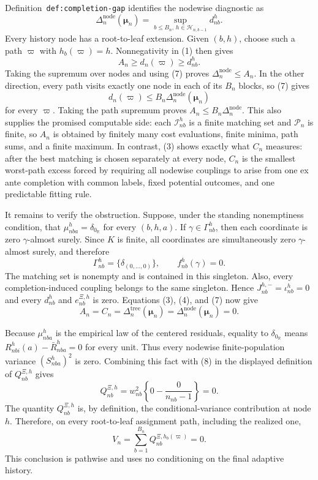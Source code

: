 Definition~\texttt{def:completion-gap} identifies the nodewise diagnostic as
\[
 \Delta_n^{\mathrm{node}}(\boldsymbol\mu_n)
 =\sup_{b\le B_n,\,h\in\mathcal H_{n,b-1}}d_{nb}^{h}. \tag{7}
\]
Every history node has a root-to-leaf extension.  Given \((b,h)\), choose such a path \(\varpi\) with \(h_b(\varpi)=h\).  Nonnegativity in (1) then gives
\[
 A_n\ge d_n(\varpi)\ge d_{nb}^{h}.
\]
Taking the supremum over nodes and using (7) proves
\(\Delta_n^{\mathrm{node}}\le A_n\).  In the other direction, every path visits exactly one node in each of its \(B_n\) blocks, so (7) gives
\[
 d_n(\varpi)\le B_n\Delta_n^{\mathrm{node}}(\boldsymbol\mu_n)
\]
for every \(\varpi\).  Taking the path supremum proves
\(A_n\le B_n\Delta_n^{\mathrm{node}}\).  This also supplies the promised computable side: each \(\mathcal I_{nb}^{h}\) is a finite matching set and \(\mathcal P_n\) is finite, so \(A_n\) is obtained by finitely many cost evaluations, finite minima, path sums, and a finite maximum.  In contrast, (3) shows exactly what \(C_n\) measures: after the best matching is chosen separately at every node, \(C_n\) is the smallest worst-path excess forced by requiring all nodewise couplings to arise from one ex ante completion with common labels, fixed potential outcomes, and one predictable fitting rule.

It remains to verify the obstruction.  Suppose, under the standing nonemptiness condition, that
\(\mu_{nba}^{h}=\delta_{0_{\mathbb R}}\) for every \((b,h,a)\).  If \(\gamma\in\Gamma_{nb}^{h}\), then each coordinate is zero \(\gamma\)-almost surely.  Since \(K\) is finite, all coordinates are simultaneously zero \(\gamma\)-almost surely, and therefore
\[
 \Gamma_{nb}^{h}=\{\delta_{(0,\ldots,0)}\},
 \qquad f_{nb}^{h}(\gamma)=0. \tag{8}
\]
The matching set is nonempty and is contained in this singleton.  Also, every completion-induced coupling belongs to the same singleton.  Hence \(J_{nb}^{h,-}=\iota_{nb}^{h}=0\) and every \(d_{nb}^{h}\) and \(e_{nb}^{\Xi,h}\) is zero.  Equations (3), (4), and (7) now give
\[
 A_n=C_n=\Delta_n^{\mathrm{tree}}(\boldsymbol\mu_n)
 =\Delta_n^{\mathrm{node}}(\boldsymbol\mu_n)=0. \tag{9}
\]

Because \(\mu_{nba}^{h}\) is the empirical law of the centered residuals, equality to \(\delta_{0_{\mathbb R}}\) means
\(R_{nbi}^{h}(a)-\bar R_{nba}^{h}=0\) for every unit.  Thus every nodewise finite-population variance \((S_{nba}^{h})^2\) is zero.  Combining this fact with (8) in the displayed definition of \(Q_{nb}^{\Xi,h}\) gives
\[
 Q_{nb}^{\Xi,h}=w_{nb}^2\left\{0-\frac0{n_{nb}-1}\right\}=0. \tag{10}
\]
The quantity \(Q_{nb}^{\Xi,h}\) is, by definition, the conditional-variance contribution at node \(h\).  Therefore, on every root-to-leaf assignment path, including the realized one,
\[
 V_n=\sum_{b=1}^{B_n}Q_{nb}^{\Xi,h_b(\varpi)}=0. \tag{11}
\]
This conclusion is pathwise and uses no conditioning on the final adaptive history.

